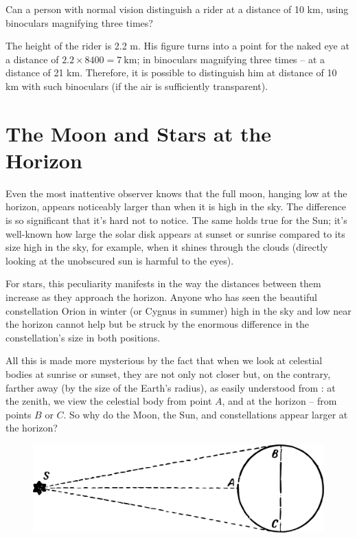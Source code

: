 \ques Can a person with normal vision distinguish a rider at a distance of 10 km, using binoculars magnifying three times?

\ans The height of the rider is 2.2 m. His figure turns into a point for the naked eye at a distance of $2.2 \times 8400 = \SI{7}{\kilo\meter}$; in binoculars magnifying three times -- at a distance of 21 km. Therefore, it is possible to distinguish him at distance of 10 km with such binoculars (if the air is sufficiently transparent).
\clearpage

\section{The Moon and Stars at the Horizon}
\label{sec-3.13}

Even the most inattentive observer knows that the full moon, hanging low at the horizon, appears noticeably larger than when it is high in the sky. The difference is so significant that it's hard not to notice. The same holds true for the Sun; it's well-known how large the solar disk appears at sunset or sunrise compared to its size high in the sky, for example, when it shines through the clouds (directly looking at the unobscured sun is harmful to the eyes).

For stars, this peculiarity manifests in the way the distances between them increase as they approach the horizon. Anyone who has seen the beautiful constellation Orion in winter (or Cygnus in summer) high in the sky and low near the horizon cannot help but be struck by the enormous difference in the constellation's size in both positions.


All this is made more mysterious by the fact that when we look at celestial bodies at sunrise or sunset, they are not only not closer but, on the contrary, farther away (by the size of the Earth's radius), as easily understood from : at the zenith, we view the celestial body from point $A$, and at the horizon -- from points $B$ or $C$. So why do the Moon, the Sun, and constellations appear larger at the horizon?


\begin{figure}[h!]
\centering
\includegraphics[width=\textwidth]{figures/ch-03/fig-074.pdf}
\end{figure}


